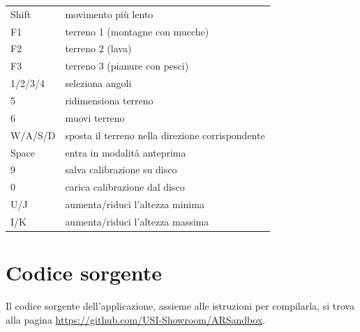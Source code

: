 \documentclass[12pt]{article}
\begin{document}
	\begin{tabular}{l l}
		Shift & movimento più lento\\

		F1 & terreno 1 (montagne con mucche)\\
		F2 & terreno 2 (lava)\\
		F3 & terreno 3 (pianure con pesci)\\

		1/2/3/4 & seleziona angoli\\
		5 & ridimensiona terreno\\
		6 & muovi terreno\\

		W/A/S/D & sposta il terreno nella direzione corrispondente\\

		Space & entra in modalità anteprima\\

		9 & salva calibrazione su disco\\
		0 & carica calibrazione dal disco\\

		U/J & aumenta/riduci l'altezza minima\\
		I/K & aumenta/riduci l'altezza massima\\
	\end{tabular}
		
		
\section{Codice sorgente}\label{sec:code}

	Il codice sorgente dell'applicazione, assieme alle istruzioni per compilarla, si trova alla pagina \url{https://github.com/USI-Showroom/ARSandbox}.
		
	
\end{document}
